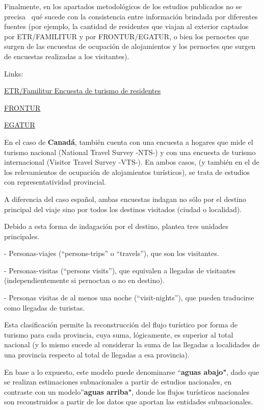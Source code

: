 \documentclass[
]{book}
\begin{document}
Finalmente, en los apartados metodológicos de los estudios publicados no se precisa~ qué sucede con la consistencia entre información brindada por diferentes fuentes (por ejemplo, la cantidad de residentes que viajan al exterior captados por ETR/FAMILITUR y por FRONTUR/EGATUR, o bien los pernoctes que surgen de las encuestas de ocupación de alojamientos y los pernoctes que surgen de encuestas realizadas a los visitantes).

Links:

\href{https://www.ine.es/dyngs/INEbase/es/operacion.htmc=Estadistica_C\&cid=1254736176990\&menu=ultiDatos\&idp=1254735576863}{ETR/Familitur Encuesta de turismo de residentes}

\href{https://www.ine.es/dyngs/INEbase/es/operacion.htmc=Estadistica_C\&cid=1254736176996\&menu=ultiDatos\&idp=1254735576863}{FRONTUR}

\href{https://www.ine.es/dyngs/INEbase/es/operacion.htmc=Estadistica_C\&cid=1254736177002\&menu=ultiDatos\&idp=1254735576863}{EGATUR}

En el caso de \textbf{Canadá}, también cuenta con una encuesta a hogares que mide el turismo nacional (National Travel Survey -NTS-) y con una encuesta de turismo internacional (Visitor Travel Survey -VTS-). En ambos casos, (y también en el de los relevamientos de ocupación de alojamientos turísticos), se trata de estudios con representatividad provincial.

A diferencia del caso español, ambas encuestas indagan no sólo por el destino principal del viaje sino por todos los destinos visitados (ciudad o localidad).

Debido a esta forma de indagación por el destino, plantea tres unidades principales.

- Personas-viajes (``persons-trips'' o ``travels''), que son los visitantes.

- Personas-visitas (``persons visits''), que equivalen a llegadas de visitantes (independientemente si pernoctan o no en destino).

- Personas visitas de al menos una noche (``visit-nights''), que pueden traducirse como llegadas de turistas.

Esta clasificación permite la reconstrucción del flujo turístico por forma de turismo para cada provincia, cuya suma, lógicamente, es superior al total nacional (y lo mismo sucede al considerar la suma de las llegadas a localidades de una provincia respecto al total de llegadas a esa provincia).

En base a lo expuesto, este modelo puede denominarse ``\textbf{aguas abajo"}, dado que se realizan estimaciones subnacionales a partir de estudios nacionales, en contraste con un modelo''\textbf{aguas arriba"}, donde los flujos turísticos nacionales son reconstruidos a partir de los datos que aportan las entidades subnacionales.
\end{document}
